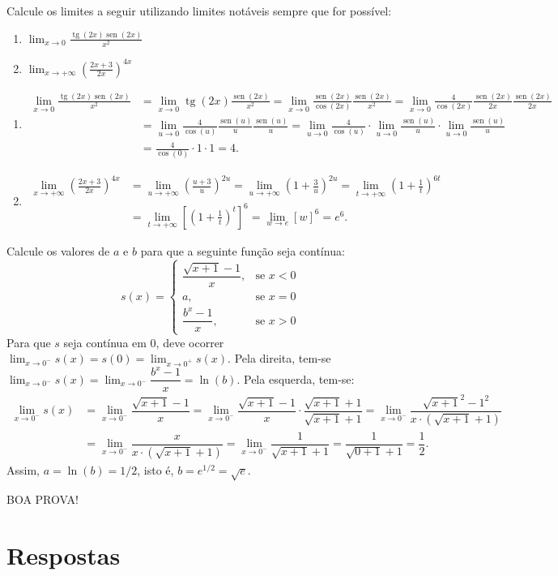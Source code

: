 \documentclass[12pt,a4paper]{article}
\newcommand*\sen{\operatorname{sen}}
\newcommand*\tg{\operatorname{tg}}
\begin{document}
\begin{ExerciseList}
\Exercise[title={2,0}] Calcule os limites a seguir utilizando limites notáveis sempre que for possível:
\begin{enumerate}
\item $\displaystyle\lim_{x \to 0} \frac{\tg(2x)\sen(2x)}{x^2}$
\item $\displaystyle\lim_{x \to +\infty} \left(\frac{2x+3}{2x}\right)^{4x}$
\end{enumerate}
\Answer
\begin{enumerate}
\item
\begin{align*}
  \lim_{x \to 0} \frac{\tg(2x)\sen(2x)}{x^2}
& = \lim_{x \to 0} \tg(2x)\frac{\sen(2x)}{x^2}
  = \lim_{x \to 0} \frac{\sen(2x)}{\cos(2x)}\frac{\sen(2x)}{x^2}
  = \lim_{x \to 0} \frac{4}{\cos(2x)}\frac{\sen(2x)}{2x}\frac{\sen(2x)}{2x}\\
& = \lim_{u \to 0} \frac{4}{\cos(u)}\frac{\sen(u)}{u} \frac{\sen(u)}{u}
  = \lim_{u \to 0} \frac{4}{\cos(u)}
    \cdot\lim_{u \to 0} \frac{\sen(u)}{u}
    \cdot\lim_{u \to 0} \frac{\sen(u)}{u}\\
& = \frac{4}{\cos(0)}\cdot 1\cdot 1 = 4.
\end{align*}
\item
\begin{align*}
  \lim_{x \to +\infty} \left(\frac{2x+3}{2x}\right)^{4x}
& = \lim_{u \to +\infty} \left(\frac{u+3}{u}\right)^{2u}
= \lim_{u \to +\infty} \left(1+\frac{3}{u}\right)^{2u}
= \lim_{t \to +\infty} \left(1+\frac{1}{t}\right)^{6t}\\
& = \lim_{t \to +\infty} \left[\left(1+\frac{1}{t}\right)^{t}\right]^6
  = \lim_{w \to e} \left[w\right]^6 = e^6.
\end{align*}
\end{enumerate}

\Exercise[title={2,0}] Calcule os valores de $a$ e $b$ para que a seguinte função seja contínua:
\[
s(x) = \begin{cases}
\dfrac{\sqrt{x+1} - 1}{x}, & \text{se } x<0\\
a, & \text{se } x=0\\
\dfrac{b^x - 1}{x}, & \text{se } x > 0
\end{cases}
\]
\Answer Para que $s$ seja contínua em $0$, deve ocorrer $\lim_{x \to 0^-}s(x) = s(0) = \lim_{x\to 0^+} s(x)$. Pela direita, tem-se $\lim_{x \to 0^-} s(x) = \lim_{x \to 0^-} \dfrac{b^x - 1}{x} = \ln(b)$. Pela esquerda, tem-se:
\begin{align*}
\lim_{x \to 0^-} s(x)
& = \lim_{x \to 0^-} \dfrac{\sqrt{x+1} - 1}{x}
= \lim_{x \to 0^-} \dfrac{\sqrt{x+1} - 1}{x} \cdot \dfrac{\sqrt{x+1} + 1}{\sqrt{x+1} + 1}
  = \lim_{x \to 0^-} \dfrac{\sqrt{x+1}^2 - 1^2}{x \cdot (\sqrt{x+1} + 1)} \\
& = \lim_{x \to 0^-} \dfrac{x}{x \cdot (\sqrt{x+1} + 1)}
  = \lim_{x \to 0^-} \dfrac{1}{\sqrt{x+1} + 1}
  = \dfrac{1}{\sqrt{0+1} + 1}
  = \dfrac{1}{2}.
\end{align*}
Assim, $a = \ln(b) = 1/2$, isto é, $b = e^{1/2} = \sqrt{e}$.
\end{ExerciseList}

\begin{center}
BOA PROVA!
\end{center}

\newpage
\restoregeometry
\section*{Respostas}
\shipoutAnswer
\end{document}
